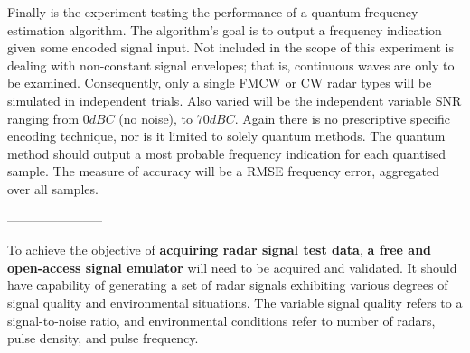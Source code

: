 Finally is the experiment testing the performance of a quantum frequency estimation algorithm.
The algorithm's goal is to output a frequency indication given some encoded signal input.
Not included in the scope of this experiment is dealing with non-constant signal envelopes; that is, continuous waves are only to be examined.
Consequently, only a single \ac{FMCW} or \ac{CW} radar types will be simulated in independent trials.
Also varied will be the independent variable \ac{SNR} ranging from $0dBC$ (no noise), to $70dBC$.
Again there is no prescriptive specific encoding technique, nor is it limited to solely quantum
methods.
The quantum method should output a most probable frequency indication for each quantised sample.
The measure of accuracy will be a \ac{RMSE} frequency error, aggregated over all samples. 


-----------------------

To achieve the objective of \textbf{acquiring radar signal test data}, \textbf{a free and open-access signal emulator} will need to be acquired and validated. 
It should have capability of  generating a set of radar signals exhibiting various degrees of signal quality and environmental situations. 
The variable signal quality refers to a signal-to-noise ratio, and environmental conditions refer to number of radars, pulse density, and pulse frequency.






